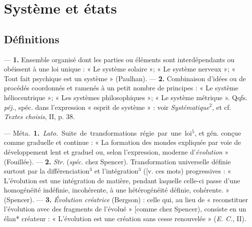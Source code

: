 \newpage

\section{Système et états}
\subsection{Définitions}
	\begin{itemize}[leftmargin=1cm, label=, itemsep=1pt]

 —  {\bf 1.} Ensemble organisé dont les parties
ou éléments sont interdépendants ou obéissent à une loi unique : « Le
système solaire »; « Le système nerveux »; « Tout fait psychique est un
système » (Paulhan). —  {\bf 2.} Combinaison d'idées ou de
procédés coordonnés et ramenés à un petit nombre de principes : « Le système
héliocentrique »; « Les systèmes philosophiques »; « Le système métrique ».
Qqfs. {\it péj.}, spéc. dans l'expression « esprit de système » : voir {\it
Systématique}$^2$, et cf. {\it Textes choisis}, II, p. 38.

 — \si{Méta.} {\bf 1.} {\it Lato.} Suite de
transformations régie par une loi$^5$,
et gén. conçue comme graduelle et
continue : « La formation des mondes
expliquée par voie de développement lent et graduel ou, selon
l'expression, moderne d'{\it évolution} »
(Fouillée). — {\bf 2.} {\it Str.} ({\it spéc.} chez
Spencer). Transformation universelle définie surtout par la différenciation$^3$ et l'intégration$^3$ ([v. ces
mots) progressives : « L’évolution
est une intégration de matière, pendant laquelle celle-ci passe d’une
homogénéité indéfinie, incohérente,
à une hétérogénéité définie, cohérente. » (Spencer). — {\bf 3.}
{\it Évolution créatrice} (Bergson) : celle qui, au
lieu de « reconstituer l’évolution
avec des fragments de l’évolué »
[comme chez Spencer), consiste en
un élan* créateur : « L'évolution
est une création sans cesse renouvelée » ({\it E. C.}, II).

	\end{itemize}
